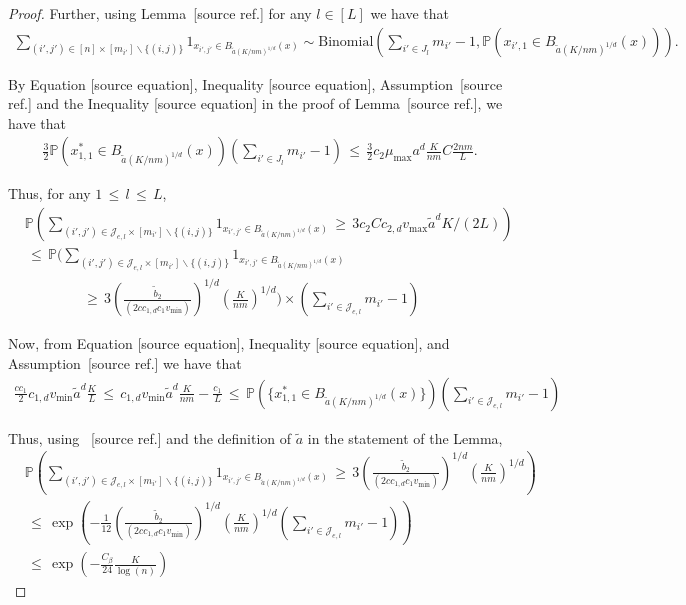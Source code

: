 \documentclass[twoside,11pt]{article}
\makeatletter
\newcommand{\discardlabel}[1]{}
\newcommand{\discardtwo}[2]{}
\newcommand{\legacyref}[1]{\textup{[source ref.]}}
\newcommand{\legacyeqref}[1]{\textup{[source equation]}}
\newenvironment{legacycomparison}{%
  \begingroup\color{legacygray}%
  \let\label\discardlabel
  \let\originallabel\discardlabel
  \let\ref\legacyref
  \let\pageref\legacyref
  \let\eqref\legacyeqref
  \let\cref\legacyref
  \let\Cref\legacyref
  \let\autoref\legacyref
  \let\aliasref\discardtwo
}{\endgroup}
\newcommand{\aliasref}[2]{%
  \@ifundefined{r@#2}{}{%
    \expandafter\let\csname r@#1\expandafter\endcsname\csname r@#2\endcsname}}
\makeatother
\begin{document}
\begin{legacycomparison}
\begin{proof}
Further, using Lemma~\ref{Lemma_9} for any \( l \in [L] \) we have that
\begin{align}
\sum_{(i',j')\in[n] \times [m_{i'}]\backslash\{(i,j)\}} 1_{x_{i',j'}\in B_{\tilde a(K/nm)^{1/d}}(x)} \sim \text{Binomial}\left( \sum_{i' \in J_l} m_{i'} - 1, \mathbb{P}(x_{i',1} \in B_{\tilde a(K/nm)^{1/d}}(x)) \right).
\end{align}

By Equation \eqref{eq:288}, Inequality \eqref{eq:289}, Assumption~\ref{asm:m} and the Inequality \eqref{eq:272} in the proof of Lemma~\ref{Lemma_13}, we have that
\begin{align}
\frac{3}{2} \mathbb{P}\left(x_{1,1}^* \in B_{\tilde a(K/nm)^{1/d}}(x)\right) \left( \sum_{i' \in J_l} m_{i'} - 1 \right) \,\leq\, \frac{3}{2} c_2\mu_{\text{max}}a^d \frac{K}{nm} C \frac{2nm}{L}.
\end{align}

Thus, for any \( 1 \,\leq\, l \,\leq\, L \),
\begin{align}
    &\mathbb{P}\left( \sum_{(i',j')\in\mathcal{J}_{e,l}\times[m_{i'}]\backslash\{(i,j)\}} 1_{x_{i',j'} \in B_{\tilde a(K/nm)^{1/d}}(x)} \,\geq\, 3c_2Cc_{2,d}v_{\text{max}}{\tilde a}^dK/(2L) \right) \nonumber
   \\ &\,\leq\, \mathbb{P}\bigg( \sum_{(i',j')\in\mathcal{J}_{e,l}\times[m_{i'}]\backslash\{(i,j)\}} 1_{x_{i',j'} \in B_{\tilde a(K/nm)^{1/d}}(x)} \nonumber \\
   &\qquad\qquad \,\geq\, 3 \left(\frac{\tilde{b}_2}{(2cc_{1,d}c_1v_{\text{min}})}\right)^{1/d} \left( \frac{K}{nm} \right)^{1/d} \bigg)  \times \left( \sum_{i' \in \mathcal{J}_{e,l}} m_{i'} - 1 \right) \label{eq:303}
\end{align}

Now, from Equation \eqref{eq:288}, Inequality \eqref{eq:289}, and Assumption~\ref{asm:m} we have that
\begin{align}
    \frac{cc_1}{2} c_{1,d}v_{\text{min}}{\tilde a}^d\frac{K}{L} \,\leq\, c_{1,d}v_{\text{min}}{\tilde a}^d\frac{K}{nm} - \frac{c_1}{L} \,\leq\, \mathbb{P}\left( \{x_{1,1}^* \in B_{\tilde a(K/nm)^{1/d}}(x)\} \right) \left( \sum_{i' \in \mathcal{J}_{e,l}} m_{i'} - 1 \right) \label{eq:304__duplicate2}
\end{align}

Thus, using ~\ref{Lemma_12} and the definition of \(\tilde{a}\) in the statement of the Lemma,
\begin{align}
    &\mathbb{P}\left( \sum_{(i',j')\in\mathcal{J}_{e,l}\times[m_{i'}]\backslash\{(i,j)\}} 1_{x_{i',j'} \in B_{\tilde a(K/nm)^{1/d}}(x)} \,\geq\, 3 \left(\frac{\tilde{b}_2}{(2cc_{1,d}c_1v_{\text{min}})}\right)^{1/d} \left( \frac{K}{nm} \right)^{1/d} \right) \nonumber
    \\ &\,\leq\, \exp\left( -\frac{1}{12} \left(\frac{\tilde{b}_2}{(2cc_{1,d}c_1v_{\text{min}})}\right)^{1/d} \left( \frac{K}{nm} \right)^{1/d} \left( \sum_{i' \in \mathcal{J}_{e,l}} m_{i'} - 1 \right) \right) \nonumber 
    \\ &\,\leq\, \exp\left( -\frac{C_{\beta}}{24} \frac{K}{\log(n)} \right) \label{eq:305}
\end{align}


\end{proof}
\end{legacycomparison}
\end{document}
